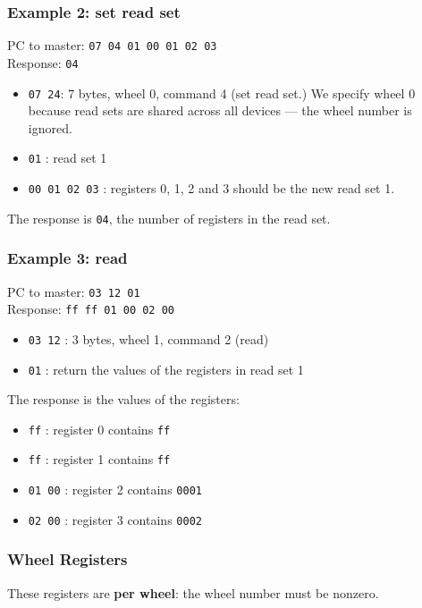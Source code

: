 \subsubsection{Example 2: set read set}
PC to master: \verb+07 04 01 00 01 02 03+ \\
Response: \verb+04+ 
\begin{itemize}
\item \verb+07 24+: 7 bytes, wheel 0, command 4 (set read set.) We specify wheel 0 because read sets 
are shared across all devices --- the wheel number is ignored.
\item \verb+01+ : read set 1
\item \verb+00 01 02 03+ : registers 0, 1, 2 and 3
should be the new read set 1.
\end{itemize}
The response is \verb+04+, the number of registers in the read set.

\subsubsection{Example 3: read}
PC to master: \verb+03 12 01+ \\
Response: \verb+ff ff 01 00 02 00+ 
\begin{itemize}
\item \verb+03 12+ : 3 bytes, wheel 1, command 2 (read)
\item \verb+01+ : return the values of the registers in read set 1
\end{itemize}
The response is the values of the registers:
\begin{itemize}
\item \verb+ff+ : register 0 contains \verb+ff+ 
\item \verb+ff+ : register 1 contains \verb+ff+ 
\item \verb+01 00+ : register 2 contains \verb+0001+ 
\item \verb+02 00+ : register 3 contains \verb+0002+ 
\end{itemize}

\subsubsection{Wheel Registers}
These registers are \textbf{per wheel}: the wheel number must be nonzero.

\vspace*{1em}

